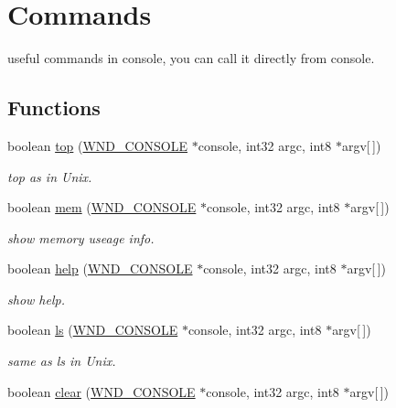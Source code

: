 \hypertarget{group__commands}{}\section{Commands}
\label{group__commands}


useful commands in console, you can call it directly from console.  


\subsection*{Functions}
\begin{DoxyCompactItemize}
\item 
boolean \hyperlink{group__commands_gacf620024990f1e8625d77afb6f6d1929}{top} (\hyperlink{struct_w_n_d___c_o_n_s_o_l_e}{W\+N\+D\+\_\+\+C\+O\+N\+S\+O\+L\+E} $\ast$console, int32 argc, int8 $\ast$argv\mbox{[}$\,$\mbox{]})
\begin{DoxyCompactList}\small\item\em top as in Unix. \end{DoxyCompactList}\item 
boolean \hyperlink{group__commands_ga18862eae7ef940382d4375c83ea2db56}{mem} (\hyperlink{struct_w_n_d___c_o_n_s_o_l_e}{W\+N\+D\+\_\+\+C\+O\+N\+S\+O\+L\+E} $\ast$console, int32 argc, int8 $\ast$argv\mbox{[}$\,$\mbox{]})
\begin{DoxyCompactList}\small\item\em show memory useage info. \end{DoxyCompactList}\item 
boolean \hyperlink{group__commands_ga728efb39e35dac554ab8a0c16dc80f02}{help} (\hyperlink{struct_w_n_d___c_o_n_s_o_l_e}{W\+N\+D\+\_\+\+C\+O\+N\+S\+O\+L\+E} $\ast$console, int32 argc, int8 $\ast$argv\mbox{[}$\,$\mbox{]})
\begin{DoxyCompactList}\small\item\em show help. \end{DoxyCompactList}\item 
boolean \hyperlink{group__commands_gac010f1f8f032da0fe585c05152468b69}{ls} (\hyperlink{struct_w_n_d___c_o_n_s_o_l_e}{W\+N\+D\+\_\+\+C\+O\+N\+S\+O\+L\+E} $\ast$console, int32 argc, int8 $\ast$argv\mbox{[}$\,$\mbox{]})
\begin{DoxyCompactList}\small\item\em same as ls in Unix. \end{DoxyCompactList}\item 
boolean \hyperlink{group__commands_gae0a32c8c94189584c1bfa8971a4941c5}{clear} (\hyperlink{struct_w_n_d___c_o_n_s_o_l_e}{W\+N\+D\+\_\+\+C\+O\+N\+S\+O\+L\+E} $\ast$console, int32 argc, int8 $\ast$argv\mbox{[}$\,$\mbox{]})

\end{DoxyCompactItemize}
